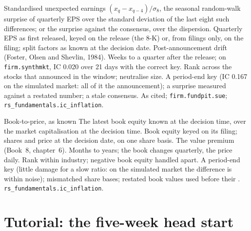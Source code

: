 \begin{predictorcard}{Standardised unexpected earnings}\label{pred:rs:fundamental-analyst-and-event-features:sue}
 $(x_q - x_{q-4})/\sigma_8$, the seasonal random-walk surprise of quarterly EPS over the standard deviation of the last
eight such differences; or the surprise against the consensus, over the dispersion.
 Quarterly EPS as first released, keyed on the release (the 8-K) or, from filings only, on the filing; split
factors as known at the decision date.
 Post-announcement drift (Foster, Olsen and Shevlin, 1984).
 Weeks to a quarter after the release; on \texttt{firm.synthmkt}, IC 0.020 over 21 days with the correct key.
 Rank across the stocks that announced in the window; neutralise size.
 A period-end key (IC 0.167 on the simulated market: all of it the announcement); a surprise measured against a
restated number; a stale consensus.
 As cited; \texttt{firm.fundpit.sue}; \texttt{rs\_fundamentals.ic\_inflation}.
\end{predictorcard}

\begin{predictorcard}{Book-to-price, as known}\label{pred:rs:fundamental-analyst-and-event-features:bp}
 The latest book equity known at the decision time, over the market capitalisation at the decision time.
 Book equity keyed on its filing; shares and price at the decision date, on one share basis.
 The value premium (Book~8, chapter~6).
 Months to years; the book changes quarterly, the price daily.
 Rank within industry; negative book equity handled apart.
 A period-end key (little damage for a slow ratio: on the simulated market the difference is within noise);
mismatched share bases; restated book values used before their .
 \texttt{rs\_fundamentals.ic\_inflation}.
\end{predictorcard}

\section{Tutorial: the five-week head start}\label{tut:rs:fundamental-analyst-and-event-features:tut}

